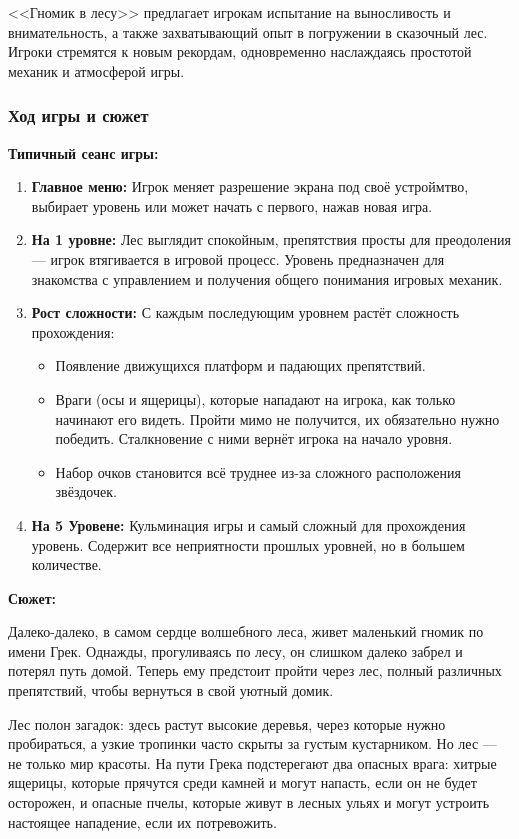 \documentclass{article}
\begin{document}
\noindent <<Гномик в лесу>> предлагает игрокам испытание на выносливость и внимательность, а также захватывающий опыт в погружении в сказочный лес. Игроки стремятся к новым рекордам, одновременно наслаждаясь простотой механик и атмосферой игры.


\subsubsection{Ход игры и сюжет}

\textbf{Типичный сеанс игры:}
\begin{enumerate}
    \item \textbf{Главное меню:} Игрок меняет разрешение экрана под своё устроймтво, выбирает уровень или может начать с первого, нажав новая игра.
    \item \textbf{На 1 уровне:} Лес выглядит спокойным, препятствия просты для преодоления — игрок втягивается в игровой процесс. Уровень предназначен для знакомства с управлением и получения общего понимания игровых механик.
    \item \textbf{Рост сложности:} С каждым последующим уровнем растёт сложность прохождения:
    \begin{itemize}
        \item Появление движущихся платформ и падающих препятствий.
        \item Враги (осы и ящерицы), которые нападают на игрока, как только начинают его видеть. Пройти мимо не получится, их обязательно нужно победить. Сталкновение с ними вернёт игрока на начало уровня.
        \item Набор очков становится всё труднее из-за сложного расположения звёздочек.
    \end{itemize}
    \item \textbf{На 5 Уровене:} Кульминация игры и самый сложный для прохождения уровень. Содержит все неприятности прошлых уровней, но в большем количестве.
\end{enumerate}

\noindent\textbf{Сюжет:} 

Далеко-далеко, в самом сердце волшебного леса, живет маленький гномик по имени Грек. Однажды, прогуливаясь по лесу, он слишком далеко забрел и потерял путь домой. Теперь ему предстоит пройти через лес, полный различных препятствий, чтобы вернуться в свой уютный домик.

Лес полон загадок: здесь растут высокие деревья, через которые нужно пробираться, а узкие тропинки часто скрыты за густым кустарником. Но лес — не только мир красоты. На пути Грека подстерегают два опасных врага: хитрые ящерицы, которые прячутся среди камней и могут напасть, если он не будет осторожен, и опасные пчелы, которые живут в лесных ульях и могут устроить настоящее нападение, если их потревожить.
\end{document}
